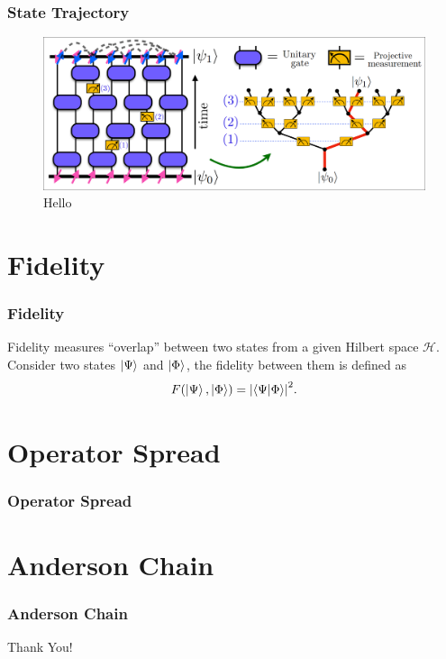 \documentclass[11pt, xcolor={dvipsnames, svgnames, table, x11names}, color]{beamer}
\renewcommand{\H}{\mathcal{H}}
\begin{document}
\begin{frame}
    \frametitle{State Trajectory}
    \begin{figure}[H]
        \centering
        \includegraphics[width=\textwidth]{images/spacetime-brickwork.png}
        \caption{Hello}
        \label{fig:Trajectory}
    \end{figure}
\end{frame}


\section{Fidelity}
\begin{frame}
    \frametitle{Fidelity}
    \begin{definition}[Fidelity]
        Fidelity measures “overlap” between two states from a given Hilbert space $\H$. Consider two states $\ket{\Psi}$ and $\ket{\Phi}$, the fidelity between them is defined as
        \begin{equation*}
            F(\ket{\Psi}, \ket{\Phi}) = \abs{\ip{\Psi}{\Phi}}^2.
        \end{equation*}
    \end{definition}


\end{frame}


\section{Operator Spread}
\begin{frame}
    \frametitle{Operator Spread}
\end{frame}


\section{Anderson Chain}
\begin{frame}
    \frametitle{Anderson Chain}
\end{frame}


\begin{frame}
    \begin{center}
        \Huge{Thank You!}
    \end{center}
\end{frame}
\end{document}
